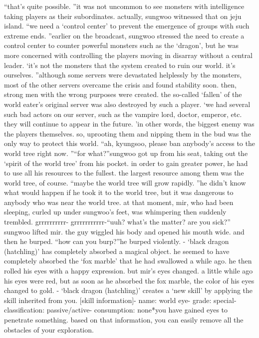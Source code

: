 “that’s quite possible.
”it was not uncommon to see monsters with intelligence taking players as their subordinates.
 actually, sungwoo witnessed that on jeju island.
“we need a ‘control center’ to prevent the emergence of groups with such extreme ends.
”earlier on the broadcast, sungwoo stressed the need to create a control center to counter powerful monsters such as the ‘dragon’, but he was more concerned with controlling the players moving in disarray without a central leader.
‘it’s not the monsters that the system created to ruin our world.
 it’s ourselves.
”although some servers were devastated helplessly by the monsters, most of the other servers overcame the crisis and found stability soon.
 then, strong men with the wrong purposes were created.
 the so-called ‘fallen’ of the world eater’s original server was also destroyed by such a player.
‘we had several such bad actors on our server, such as the vampire lord, doctor, emperor, etc.
 they will continue to appear in the future.
’in other words, the biggest enemy was the players themselves.
 so, uprooting them and nipping them in the bud was the only way to protect this world.
“ah, kyungsoo, please ban anybody’s access to the world tree right now.
”“for what?”sungwoo got up from his seat, taking out the ‘spirit of the world tree’ from his pocket.
 in order to gain greater power, he had to use all his resources to the fullest.
the largest resource among them was the world tree, of course.
“maybe the world tree will grow rapidly.
”he didn’t know what would happen if he took it to the world tree, but it was dangerous to anybody who was near the world tree.
at that moment, mir, who had been sleeping, curled up under sungwoo’s feet, was whimpering then suddenly trembled.
grrrrrrrrrr- grrrrrrrrrrr-“uuh? what’s the matter? are you sick?”
sungwoo lifted mir.
 the guy wiggled his body and opened his mouth wide.
and then he burped.
“how can you burp?”he burped violently.
- ‘black dragon (hatchling)’ has completely absorbed a magical object.
he seemed to have completely absorbed the ‘fox marble’ that he had swallowed a while ago.
 he then rolled his eyes with a happy expression.
but mir’s eyes changed.
 a little while ago his eyes were red, but as soon as he absorbed the fox marble, the color of his eyes changed to gold.
- ‘black dragon (hatchling)’ creates a ‘new skill’ by applying the skill inherited from you.
[skill information]- name: world eye- grade: special- classification: passive/active- consumption: none*you have gained eyes to penetrate something.
 based on that information, you can easily remove all the obstacles of your exploration.

